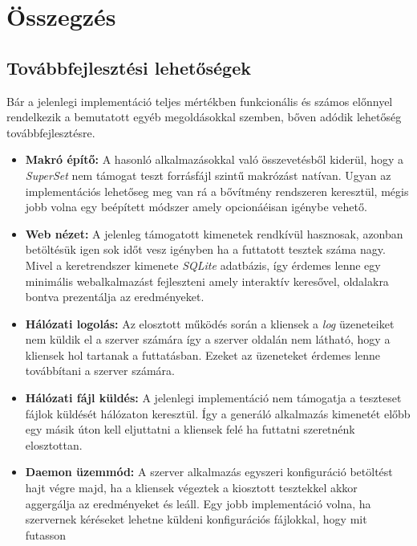 \chapter{Összegzés}

\section{Továbbfejlesztési lehetőségek}

    Bár a jelenlegi implementáció teljes mértékben funkcionális és számos előnnyel rendelkezik a bemutatott egyéb
    megoldásokkal szemben, bőven adódik lehetőség továbbfejlesztésre.

    \begin{itemize}
        \item \textbf{Makró építő:} A hasonló alkalmazásokkal való összevetésből kiderül, hogy a \\ \textit{SuperSet}
              nem támogat teszt forrásfájl szintű makrózást natívan. Ugyan az implementációs lehetőseg meg van rá a
              bővítmény rendszeren keresztül, mégis jobb volna egy beépített módszer amely opcionáéisan igénybe vehető.
        \item \textbf{Web nézet:} A jelenleg támogatott kimenetek rendkívül hasznosak, azonban betöltésük igen
              sok időt vesz igényben ha a futtatott tesztek száma nagy. Mivel a keretrendszer kimenete \textit{SQLite}
              adatbázis, így érdemes lenne egy minimális webalkalmazást fejleszteni amely interaktív keresővel,
              oldalakra bontva prezentálja az eredményeket.
        \item \textbf{Hálózati logolás:} Az elosztott működés során a kliensek a \textit{log} üzeneteiket nem küldik el
              a szerver számára így a szerver oldalán nem látható, hogy a kliensek hol tartanak a futtatásban. Ezeket
              az üzeneteket érdemes lenne továbbítani a szerver számára.
        \item \textbf{Hálózati fájl küldés:} A jelenlegi implementáció nem támogatja a teszteset fájlok küldését
              hálózaton keresztül. Így a generáló alkalmazás kimenetét előbb egy másik úton kell eljuttatni a kliensek
              felé ha futtatni szeretnénk elosztottan.
        \item \textbf{Daemon üzemmód:} A szerver alkalmazás egyszeri konfiguráció betöltést hajt végre majd, ha
              a kliensek végeztek a kiosztott tesztekkel akkor aggergálja az eredményeket és leáll. Egy jobb
              implementáció volna, ha szervernek kéréseket lehetne küldeni konfigurációs fájlokkal, hogy mit futasson

\end{itemize}
